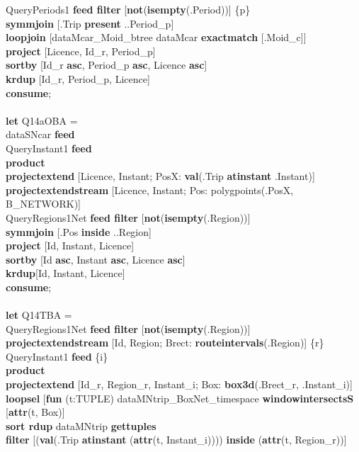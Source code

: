 \documentclass[a4paper]{article}
\newcommand{\op}[1]{\textbf{#1}}
\begin{document}
\begin{scriptsize}
\begin{tabbing}
\>QueryPeriods1 \op{feed filter} [\op{not}(\op{isempty}(.Period))] \{p\}\\
\>\op{symmjoin} [.Trip \op{present} ..Period\_p]\\
\>\op{loopjoin} [dataMcar\_Moid\_btree dataMcar \op{exactmatch} [.Moid\_c]]\\
\>\op{project} [Licence, Id\_r, Period\_p]\\
\>\op{sortby} [Id\_r \op{asc}, Period\_p \op{asc}, Licence \op{asc}]\\
\>\op{krdup} [Id\_r, Period\_p, Licence]\\
\op{consume};\\
\\
\op{let} Q14aOBA =\\
\>dataSNcar \op{feed}\\
\>QueryInstant1 \op{feed}\\
\>\op{product}\\
\>\>\op{projectextend} [Licence, Instant; PosX: \op{val}(.Trip \op{atinstant} .Instant)]\\
\>\>\op{projectextendstream} [Licence, Instant; Pos: polygpoints(.PosX, B\_NETWORK)]\\
\>QueryRegions1Net \op{feed filter} [\op{not}(\op{isempty}(.Region))]\\
\>\op{symmjoin} [.Pos \op{inside} ..Region]\\
\>\op{project} [Id, Instant, Licence]\\
\>\op{sortby} [Id \op{asc}, Instant \op{asc}, Licence \op{asc}]\\
\>\op{krdup}[Id, Instant, Licence]\\
\op{consume};\\
\\
\op{let} Q14TBA =\\
\>QueryRegions1Net \op{feed filter} [\op{not}(\op{isempty}(.Region))]\\
\>\>\op{projectextendstream} [Id, Region; Brect: \op{routeintervals}(.Region)] \{r\}\\
\>QueryInstant1 \op{feed} \{i\}\\
\>\op{product}\\
\>\op{projectextend} [Id\_r, Region\_r, Instant\_i; Box: \op{box3d}(.Brect\_r, .Instant\_i)]\\
\>\op{loopsel} [\op{fun} (t:TUPLE) dataMNtrip\_BoxNet\_timespace \op{windowintersectsS} [\op{attr}(t, Box)]\\
\>\>\op{sort rdup} dataMNtrip \op{gettuples}\\
\>\>\op{filter} [(\op{val}(.Trip \op{atinstant} (\op{attr}(t, Instant\_i)))) \op{inside} (\op{attr}(t, Region\_r))]\\

\end{tabbing}
\end{scriptsize}
\end{document}
